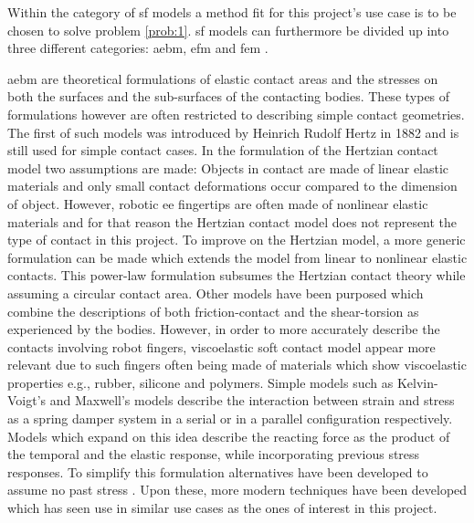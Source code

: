 Within the category of \gls{sf} models a method fit for this project's use case is to be chosen to solve problem \ref{prob:1}. \gls{sf} models can furthermore be divided up into three different categories: \gls{aebm}, \gls{efm} and \gls{fem} \cite{a-modified-elastic-foundation-contact-model-for-application-in-3d-models-of-the-prosthetic-knee}. \medskip

\gls{aebm} are theoretical formulations of elastic contact areas and the stresses on both the surfaces and the sub-surfaces of the contacting bodies. These types of formulations however are often restricted to describing simple contact geometries. The first of such models was introduced by Heinrich Rudolf Hertz in 1882\cite*{on-the-contact-of-rigid-elastic-solids-and-on-hardness} and is still used for simple contact cases. In the formulation of the Hertzian contact model two assumptions are made: Objects in contact are made of linear elastic materials and only small contact deformations occur compared to the dimension of object. However, robotic \gls{ee} fingertips are often made of nonlinear elastic materials and for that reason the Hertzian contact model does not represent the type of contact in this project\cite[Chapter 37]{handbook-of-robotics}. To improve on the Hertzian model, a more generic formulation can be made which extends the model from linear to nonlinear elastic contacts\cite*{modeling-of-contact-mechanics-and-friction-limit-surfaces-for-soft-fingers-in-robotics-with-experimental-results}\cite*{the-haptic-and-perceptional-characteristics-of-an-anthropomorphic-curved-soft-finger-structure}. This power-law formulation subsumes the Hertzian contact theory while assuming a circular contact area. Other models have been purposed which combine the descriptions of both friction-contact and the shear-torsion as experienced by the bodies\cite{the-sliding-of-robot-fingers-under-combined-torsion-and-shear-loading}. However, in order to more accurately describe the contacts involving robot fingers, viscoelastic soft contact model appear more relevant due to such fingers often being made of materials which show viscoelastic properties e.g., rubber, silicone and polymers. Simple models such as  Kelvin-Voigt's\cite*{viscoelasticity} and Maxwell's\cite{on-the-dynamical-theory-of-gases} models describe the interaction between strain and stress as a spring damper system in a serial or in a parallel configuration respectively. Models which expand on this idea describe the reacting force as the product of the temporal and the elastic response, while incorporating previous stress responses\cite{mechanical-properties-and-active-remodeling-of-blood-vessels}. To simplify this formulation alternatives have been developed to assume no past stress \cite{modeling-of-viscoelastic-contacts-and-evolution-of-limit-surface-for-robotic-contact-interface}\cite*{characteristics-of-contact-and-limit-surface-for-viscoelastic-fingers}\cite*{effect-of-layer-compliance-on-frictional-behavior-of-soft-robotic-fingers}. Upon these, more modern techniques have been developed which has seen use in similar use cases as the ones of interest in this project. 
